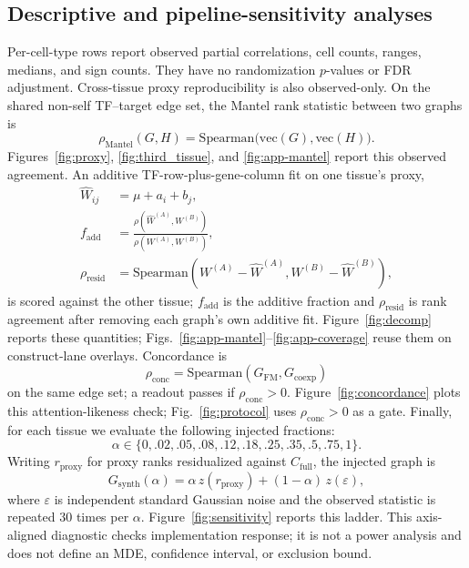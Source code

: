 \documentclass[fleqn,10pt,lineno]{wlpeerj}
\begin{document}
\subsection{Descriptive and pipeline-sensitivity analyses}
Per-cell-type rows report observed partial correlations, cell counts, ranges, medians, and sign counts.
They have no randomization $p$-values or FDR adjustment. Cross-tissue proxy reproducibility is also
observed-only.
On the shared non-self TF--target edge set, the Mantel rank statistic between two graphs is
\begin{equation}
\label{eq:mantel}
\rho_{\mathrm{Mantel}}(G,H)
=
\mathrm{Spearman}\bigl(\mathrm{vec}(G),\mathrm{vec}(H)\bigr).
\end{equation}
Figures~\ref{fig:proxy}, \ref{fig:third_tissue}, and \ref{fig:app-mantel} report this observed agreement.
An additive TF-row-plus-gene-column fit on one tissue's proxy,
\begin{equation}
\label{eq:decomp}
\begin{aligned}
\widehat{W}_{ij}
&=
\mu+a_i+b_j,\\
f_{\mathrm{add}}
&=
\frac{\rho(\widehat{W}^{(A)},W^{(B)})}{\rho(W^{(A)},W^{(B)})},\\
\rho_{\mathrm{resid}}
&=
\mathrm{Spearman}(W^{(A)}-\widehat{W}^{(A)},W^{(B)}-\widehat{W}^{(B)}),
\end{aligned}
\end{equation}
is scored against the other tissue; $f_{\mathrm{add}}$ is the additive fraction and $\rho_{\mathrm{resid}}$ is rank agreement after removing each graph's own additive fit.
Figure~\ref{fig:decomp} reports these quantities; Figs.~\ref{fig:app-mantel}--\ref{fig:app-coverage} reuse them on construct-lane overlays.
Concordance is
\begin{equation}
\label{eq:concordance}
\rho_{\mathrm{conc}}
=
\mathrm{Spearman}(G_{\mathrm{FM}},G_{\mathrm{coexp}})
\end{equation}
on the same edge set; a readout passes if $\rho_{\mathrm{conc}}>0$.
Figure~\ref{fig:concordance} plots this attention-likeness check; Fig.~\ref{fig:protocol} uses $\rho_{\mathrm{conc}}>0$ as a gate.
Finally, for each tissue we evaluate the following injected fractions:
\[
\alpha\in\{0,.02,.05,.08,.12,.18,.25,.35,.5,.75,1\}.
\]
Writing $r_{\mathrm{proxy}}$ for proxy ranks residualized against $C_{\mathrm{full}}$, the injected graph is
\begin{equation}
\label{eq:injection}
G_{\mathrm{synth}}(\alpha)
=
\alpha\, z(r_{\mathrm{proxy}})
+
(1-\alpha)\, z(\varepsilon),
\end{equation}
where $\varepsilon$ is independent standard Gaussian noise and the observed statistic is repeated
$30$ times per $\alpha$.
Figure~\ref{fig:sensitivity} reports this ladder.
This axis-aligned diagnostic checks implementation
response; it is not a power analysis and does not define an MDE, confidence interval, or exclusion
bound.
\end{document}

